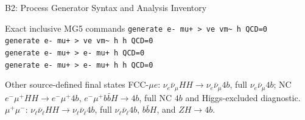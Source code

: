 \documentclass[aspectratio=1610,english]{beamer}
\newcommand{\src}[1]{\vfill{\par\color{black!65}\fontsize{6.4}{7.4}\selectfont\emph{Source:} #1\par}}
\newcommand{\key}[1]{\begin{alertblock}{Physics takeaway}\small  #1\end{alertblock}}
\begin{document}
\begin{frame}[t]{B2: Process Generator Syntax and Analysis Inventory}
\small

\begin{block}{Exact inclusive MG5 commands}
\texttt{generate e- mu+ > ve vm\textasciitilde{} h QCD=0}\\
\texttt{generate e- mu+ > ve vm\textasciitilde{} h h QCD=0}\\
\texttt{generate e- mu+ > e- mu+ h QCD=0}\\
\texttt{generate e- mu+ > e- mu+ h h QCD=0}
\end{block}
\begin{block}{Other source-defined final states}
\scriptsize
FCC-$\mu e$: $\nu_e\bar\nu_\mu HH\to\nu_e\bar\nu_\mu4b$, full $\nu_e\bar\nu_\mu4b$; NC $e^-\mu^+HH\to e^-\mu^+4b$, $e^-\mu^+b\bar bH\to4b$, full NC $4b$ and Higgs-excluded diagnostic.\\
$\mu^+\mu^-$: $\nu_\ell\bar\nu_\ell HH\to\nu_\ell\bar\nu_\ell4b$, full $\nu_\ell\bar\nu_\ell4b$, $b\bar bH$, and $ZH\to4b$.
\end{block}


\end{frame}
\end{document}

